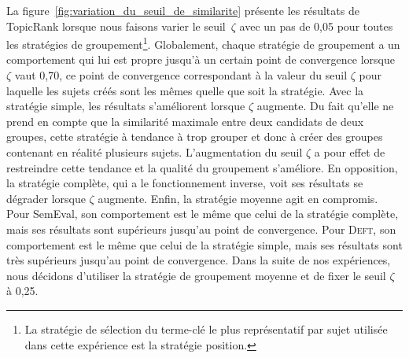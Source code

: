         La figure~\ref{fig:variation_du_seuil_de_similarite} présente les
        résultats de TopicRank lorsque nous faisons varier le seuil~$\zeta$ avec
        un pas de 0,05 pour toutes les stratégies de groupement\footnote{La
        stratégie de sélection du terme-clé le plus représentatif par sujet
        utilisée dans cette expérience est la stratégie position.}.
        Globalement, chaque stratégie de groupement a un comportement qui lui
        est propre jusqu'à un certain point de convergence lorsque $\zeta$ vaut
        0,70, ce point de convergence correspondant à la valeur du seuil $\zeta$
        pour laquelle les sujets créés sont les mêmes quelle que soit la
        stratégie. Avec la stratégie simple, les résultats s'améliorent lorsque
        $\zeta$ augmente. Du fait qu'elle ne prend en compte que la similarité
        maximale entre deux candidats de deux groupes, cette stratégie à
        tendance à trop grouper et donc à créer des groupes contenant en réalité
        plusieurs sujets. L'augmentation du seuil $\zeta$ a pour effet de
        restreindre cette tendance et la qualité du groupement s'améliore. En
        opposition, la stratégie complète, qui a le fonctionnement inverse, voit
        ses résultats se dégrader lorsque $\zeta$ augmente. Enfin, la stratégie
        moyenne agit en compromis. Pour SemEval, son comportement est le même
        que celui de la stratégie complète, mais ses résultats sont supérieurs
        jusqu'au point de convergence. Pour \textsc{Deft}, son comportement est
        le même que celui de la stratégie simple, mais ses résultats sont très
        supérieurs jusqu'au point de convergence.
        Dans la suite de nos expériences, nous décidons d'utiliser la stratégie
        de groupement moyenne et de fixer le seuil $\zeta$ à 0,25.

